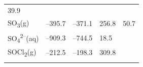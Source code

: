 \documentclass[
  9pt,
]{extbook}
\theoremstyle{definition}
\theoremstyle{definition}
\theoremstyle{definition}
\theoremstyle{remark}
\begin{document}
\begin{longtable}[]{@{}lllll@{}}
\begin{minipage}[t]{0.18\columnwidth}
39.9\strut
\end{minipage}\tabularnewline
\begin{minipage}[t]{0.10\columnwidth}\raggedright
SO\textsubscript{3}(g)\strut
\end{minipage} & \begin{minipage}[t]{0.19\columnwidth}\raggedright
--395.7\strut
\end{minipage} & \begin{minipage}[t]{0.20\columnwidth}\raggedright
--371.1\strut
\end{minipage} & \begin{minipage}[t]{0.18\columnwidth}\raggedright
256.8\strut
\end{minipage} & \begin{minipage}[t]{0.18\columnwidth}\raggedright
50.7\strut
\end{minipage}\tabularnewline
\begin{minipage}[t]{0.10\columnwidth}\raggedright
SO\textsubscript{4}\textsuperscript{2--}(aq)\strut
\end{minipage} & \begin{minipage}[t]{0.19\columnwidth}\raggedright
--909.3\strut
\end{minipage} & \begin{minipage}[t]{0.20\columnwidth}\raggedright
--744.5\strut
\end{minipage} & \begin{minipage}[t]{0.18\columnwidth}\raggedright
18.5\strut
\end{minipage} & \begin{minipage}[t]{0.18\columnwidth}\raggedright
\strut
\end{minipage}\tabularnewline
\begin{minipage}[t]{0.10\columnwidth}\raggedright
SOCl\textsubscript{2}(g)\strut
\end{minipage} & \begin{minipage}[t]{0.19\columnwidth}\raggedright
--212.5\strut
\end{minipage} & \begin{minipage}[t]{0.20\columnwidth}\raggedright
--198.3\strut
\end{minipage} & \begin{minipage}[t]{0.18\columnwidth}\raggedright
309.8\strut
\end{minipage} & \begin{minipage}[t]{0.18\columnwidth}\raggedright
\strut
\end{minipage}\tabularnewline
\begin{minipage}[t]{0.10\columnwidth}\raggedright

\end{minipage}
\end{longtable}
\end{document}
